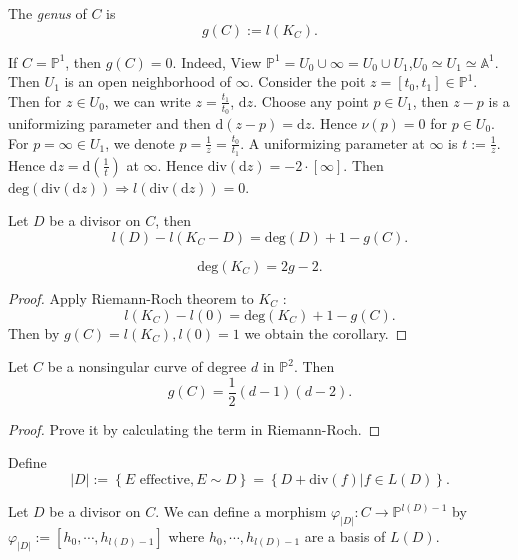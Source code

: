\begin{definition}
  The \textit{genus} of $C$ is 
  \[
    g(C):=l(K_C).
  \] 
\end{definition}

\begin{example}
  If $C=\mathbb{P}^{1}$, then $g(C)=0$. Indeed, View $\mathbb{P}^{1}=U_0\cup \infty=U_0 \cup U_1$,$U_0\simeq U_1\simeq \mathbb{A}^{1}$. Then $U_1$ is an open neighborhood of $\infty$. Consider the poit $z =[t_0,t_1] \in \mathbb{P}^{1}$. Then for $z\in U_0$, we can write $z=\frac{t_1}{t_0}$, $\mathrm{d}z$. Choose any point $p \in U_1$, then $z-p$ is a uniformizing parameter and then $\mathrm{d}(z-p)=\mathrm{d}z$. Hence $\nu(p)=0$ for $p\in U_0$. For $p=\infty \in  U_1$, we denote $p=\frac{1}{z}= \frac{t_0}{t_1}$. A uniformizing parameter at  $\infty$ is $t:=\frac{1}{z}$. Hence $\mathrm{d}z=\mathrm{d}\left( \frac{1}{t} \right) $ at $\infty$. Hence 
  $\mathrm{div}(\mathrm{d}z)=-2\cdot [\infty]$. Then $\mathrm{deg}(\mathrm{div}(\mathrm{d}z))\Rightarrow l\left(\mathrm{div}\left( \mathrm{d}z \right)   \right) =0$.
\end{example}

\begin{theorem}
  Let $D$ be a divisor on $C$, then
  \[
    l(D)-l(K_C-D)=\mathrm{deg}(D)+1-g(C).
  \] 
\end{theorem}
\begin{corollary}
  \[
    \mathrm{deg}(K_C)=2g-2.
  \] 
\end{corollary}
\begin{proof}
  Apply Riemann-Roch theorem to $K_C$ :
  \[
    l(K_C)-l(0)=\mathrm{deg}(K_C)+1-g(C).
  \] 
  Then by $g(C)=l(K_C),l(0)=1$ we obtain the corollary.
  
\end{proof}

\begin{theorem}
  Let $C$ be a nonsingular curve of degree $d$ in $\mathbb{P}^{2}$. Then 
  \[
    g(C)=\frac{1}{2}(d-1)(d-2).
  \] 
\end{theorem}
\begin{proof}
  Prove it by calculating the term in Riemann-Roch.
\end{proof}
Define
\[
  |D|:=\left\{E \text{ effective},E\sim D\right\} =\left\{D+\mathrm{div}(f)|f\in L(D)\right\} 
.\] 

Let $D$ be a divisor on $C$. We can define a morphism $\varphi_{|D|}:C\to \mathbb{P}^{l(D)-1}$ by $\varphi_{|D|}:=\left[ h_0,\cdots ,h_{l(D)-1} \right] $ where $h_0,\cdots ,h_{l(D)-1}$ are a basis of $L(D)$.

